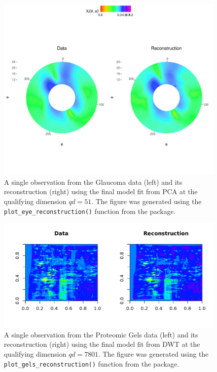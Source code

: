 \begin{figure}
    \centering
    \includegraphics[width=0.75\linewidth]{figures/eye-reconstruction.pdf}
    \caption{A single observation from the Glaucoma data (left) and its reconstruction (right) using the final model fit from PCA at the qualifying dimension $qd = 51$. The figure was generated using the \texttt{plot\_eye\_reconstruction()} function from the  package.}
    \label{fig:eye-reconstruction}
\end{figure}

\begin{figure}
    \centering
    \includegraphics[width=0.75\linewidth]{figures/gels-reconstruction.pdf}
    \caption{A single observation from the Proteomic Gels data (left) and its reconstruction (right) using the final model fit from DWT at the qualifying dimension $qd = 7801$. The figure was generated using the \texttt{plot\_gels\_reconstruction()} function from the  package.}
    \label{fig:gels-reconstruction}
\end{figure}

